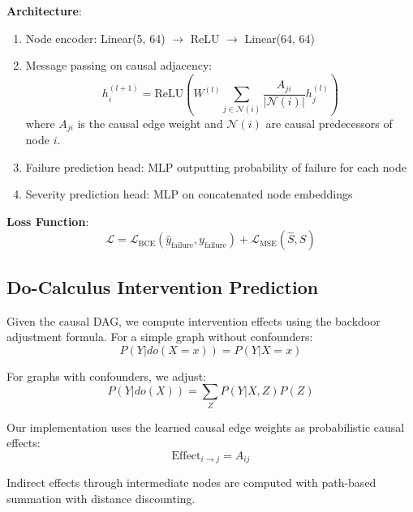 \documentclass[journal,12pt,onecolumn]{IEEEtran}
\begin{document}
\textbf{Architecture}:
\begin{enumerate}
    \item Node encoder: Linear(5, 64) $\rightarrow$ ReLU $\rightarrow$ Linear(64, 64)
    \item Message passing on causal adjacency:
    \begin{equation}
    h_i^{(l+1)} = \text{ReLU}\left(W^{(l)} \sum_{j \in \mathcal{N}(i)} \frac{A_{ji}}{|\mathcal{N}(i)|} h_j^{(l)}\right)
    \end{equation}
    where $A_{ji}$ is the causal edge weight and $\mathcal{N}(i)$ are causal predecessors of node $i$.
    
    \item Failure prediction head: MLP outputting probability of failure for each node
    \item Severity prediction head: MLP on concatenated node embeddings
\end{enumerate}

\textbf{Loss Function}:
\begin{equation}
\mathcal{L} = \mathcal{L}_{\text{BCE}}(\hat{y}_{\text{failure}}, y_{\text{failure}}) + \mathcal{L}_{\text{MSE}}(\hat{S}, S)
\label{eq:loss}
\end{equation}

\subsection{Do-Calculus Intervention Prediction}

Given the causal DAG, we compute intervention effects using the backdoor adjustment formula. For a simple graph without confounders:
\begin{equation}
P(Y | do(X=x)) = P(Y | X=x)
\label{eq:no_confound}
\end{equation}

For graphs with confounders, we adjust:
\begin{equation}
P(Y | do(X)) = \sum_Z P(Y | X, Z) P(Z)
\label{eq:backdoor}
\end{equation}

Our implementation uses the learned causal edge weights as probabilistic causal effects:
\begin{equation}
\text{Effect}_{i \rightarrow j} = A_{ij}
\label{eq:effect}
\end{equation}

Indirect effects through intermediate nodes are computed with path-based summation with distance discounting.
\end{document}

